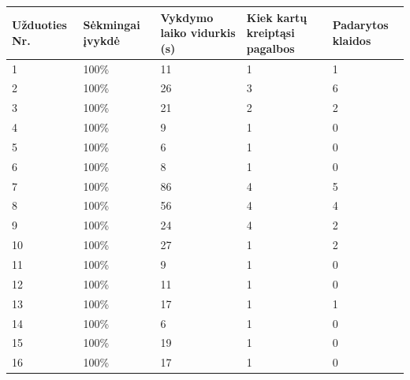 \documentclass[oneside]{VUMIFPSkursinis}
\begin{document}
\begin{center}
    \begin{tabular}{ |p{3cm}| p{3cm} |p{3cm}|p{3cm}|p{3cm}|}
\hline
Užduoties Nr.&Sėkmingai įvykdė&Vykdymo laiko vidurkis (s)&Kiek kartų kreiptąsi pagalbos&Padarytos klaidos\\ \hline
	1  & 100\% & 11 & 1 & 1 \\ \hline
	2  & 100\% & 26 & 3 & 6 \\ \hline
	3  & 100\% & 21 & 2 & 2 \\ \hline
	4  & 100\% &  9 & 1 & 0 \\ \hline
	5  & 100\% &  6 & 1 & 0 \\ \hline
	6  & 100\% &  8 & 1 & 0 \\ \hline
	7  & 100\% & 86 & 4 & 5 \\ \hline
	8  & 100\% & 56 & 4 & 4 \\ \hline
	9  & 100\% & 24 & 4 & 2 \\ \hline
	10 & 100\% & 27 & 1 & 2 \\ \hline
	11 & 100\% &  9 & 1 & 0 \\ \hline
	12 & 100\% & 11 & 1 & 0 \\ \hline
	13 & 100\% & 17 & 1 & 1 \\ \hline
	14 & 100\% &  6 & 1 & 0 \\ \hline
	15 & 100\% & 19 & 1 & 0 \\ \hline
	16 & 100\% & 17 & 1 & 0 \\ \hline
\end{tabular}
\end{center}
\end{document}
